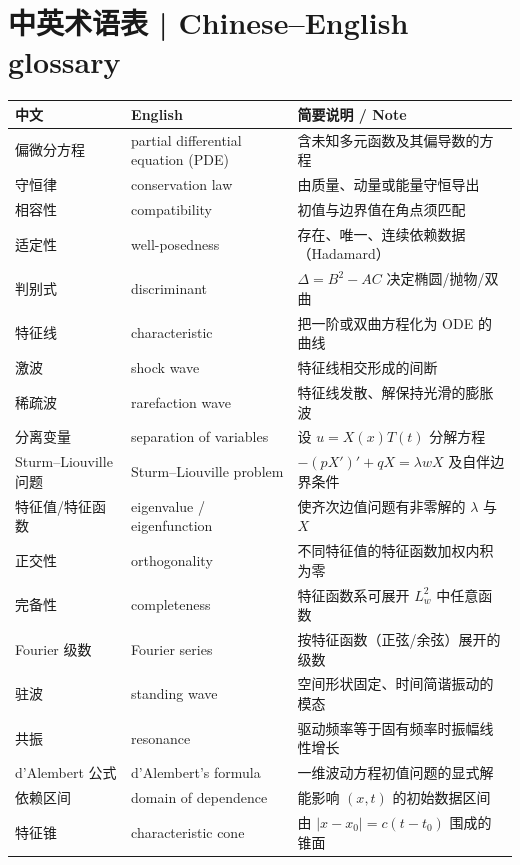\documentclass[UTF8,11pt,a4paper]{ctexart}
\begin{document}
\section*{中英术语表 | Chinese--English glossary}
\noindent\small
\begin{longtable}{@{}>{\raggedright\arraybackslash}p{2.9cm}>{\raggedright\arraybackslash}p{4.7cm}>{\raggedright\arraybackslash}p{7.0cm}@{}}
\hline
\textbf{中文} & \textbf{English} & \textbf{简要说明 / Note} \\
\hline
\endhead
偏微分方程 & partial differential equation (PDE) & 含未知多元函数及其偏导数的方程 \\
\hline
守恒律 & conservation law & 由质量、动量或能量守恒导出 \\
\hline
相容性 & compatibility & 初值与边界值在角点须匹配 \\
\hline
适定性 & well-posedness & 存在、唯一、连续依赖数据（Hadamard） \\
\hline
判别式 & discriminant & $\Delta=B^2-AC$ 决定椭圆/抛物/双曲 \\
\hline
特征线 & characteristic & 把一阶或双曲方程化为 ODE 的曲线 \\
\hline
激波 & shock wave & 特征线相交形成的间断 \\
\hline
稀疏波 & rarefaction wave & 特征线发散、解保持光滑的膨胀波 \\
\hline
分离变量 & separation of variables & 设 $u=X(x)T(t)$ 分解方程 \\
\hline
Sturm--Liouville 问题 & Sturm--Liouville problem & $-(pX')'+qX=\lambda wX$ 及自伴边界条件 \\
\hline
特征值/特征函数 & eigenvalue / eigenfunction & 使齐次边值问题有非零解的 $\lambda$ 与 $X$ \\
\hline
正交性 & orthogonality & 不同特征值的特征函数加权内积为零 \\
\hline
完备性 & completeness & 特征函数系可展开 $L^2_w$ 中任意函数 \\
\hline
Fourier 级数 & Fourier series & 按特征函数（正弦/余弦）展开的级数 \\
\hline
驻波 & standing wave & 空间形状固定、时间简谐振动的模态 \\
\hline
共振 & resonance & 驱动频率等于固有频率时振幅线性增长 \\
\hline
d'Alembert 公式 & d'Alembert's formula & 一维波动方程初值问题的显式解 \\
\hline
依赖区间 & domain of dependence & 能影响 $(x,t)$ 的初始数据区间 \\
\hline
特征锥 & characteristic cone & 由 $|x-x_0|=c(t-t_0)$ 围成的锥面 \\

\end{longtable}
\end{document}
